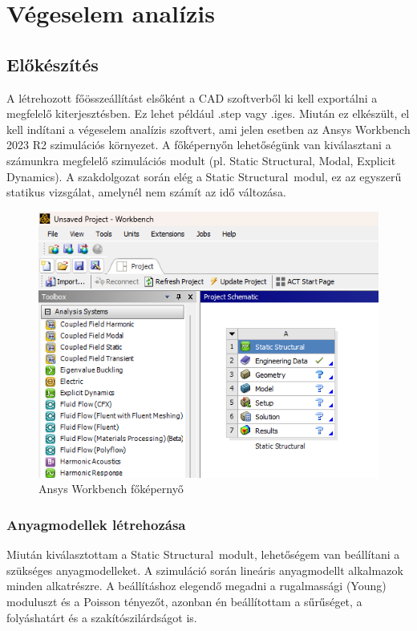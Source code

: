 \documentclass[12pt,a4paper,oneside]{report}
\begin{document}
\chapter{Végeselem analízis}
\section{Előkészítés}
A létrehozott főösszeállítást elsőként a CAD szoftverből ki kell exportálni a megfelelő kiterjesztésben. Ez lehet például .step vagy .iges. Miután ez elkészült, el kell indítani a végeselem analízis szoftvert, ami jelen esetben az Ansys Workbench 2023 R2 szimulációs környezet.
A főképernyőn lehetőségünk van kiválasztani a számunkra megfelelő szimulációs modult (pl. Static Structural, Modal, Explicit Dynamics). A szakdolgozat során elég a \glqq Static Structural\grqq\ modul, ez az egyszerű statikus vizsgálat, amelynél nem számít az idő változása.
\begin{figure}[H]
    \centering
    \includegraphics[width=12cm]{figures/ansys_1.png}
    \caption{Ansys Workbench főképernyő}
    \label{Fig:ansys_1}
\end{figure}

\subsection{Anyagmodellek létrehozása}
Miután kiválasztottam a \glqq Static Structural\grqq\ modult, lehetőségem van beállítani a szükséges anyagmodelleket. A szimuláció során lineáris anyagmodellt alkalmazok minden alkatrészre. A beállításhoz elegendő megadni a rugalmassági (Young) moduluszt és a Poisson tényezőt, azonban én beállítottam a sűrűséget, a folyáshatárt és a szakítószilárdságot is.
\end{document}
